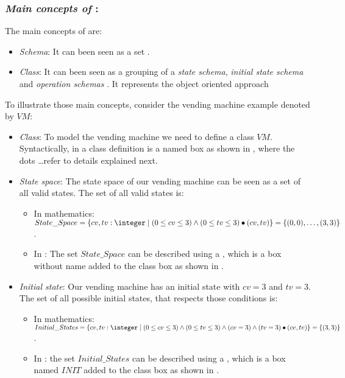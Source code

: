 \subsubsection{\textit{Main concepts of \oz{}}:} 
\label{main_concepts_oz} 
The main concepts of \oz{} are:
\begin{itemize}
\item \textit{Schema}: It can been seen as a set \cite{woodcock}.
\item \textit{Class}: It can been seen as a grouping of a \textit{state schema}, \textit{initial state schema} and \textit{operation schemas} \cite{kenji}. It represents the object oriented approach 
\end{itemize}
To illustrate those main concepts, consider the vending machine example denoted by $VM$:
\begin{itemize}
\item \textit{Class}: To model the vending machine we need to define a class $VM$. Syntactically, in \oz{}
a class definition is a named box as shown in , where the dots \dots refer to details explained next.


\item \textit{State space}: The state space of our vending machine can be seen as a set of all valid states. The set of all valid states is:
\begin{itemize}
\item In mathematics: $State\_Space=\{cv,tv: \integer\mid (0 \leq  cv \leq 3) \wedge
(0 \leq  tv \leq 3)\bullet(cv,tv)\}  =\{\pair{0}{0},\dots,\pair{3}{3}\}$.
\item In \oz{}: The set $State\_Space$ can be described using a , which is a box without name added to the class box as shown in .
\end{itemize}


\item \textit{Initial state}: Our vending machine has an initial state with $cv = 3$ and $tv = 3$. The set of all possible initial states, that respects those conditions is:  
\begin{itemize}
\item In mathematics: $Initial\_States =\{cv,tv: \integer\mid (0 \leq  cv \leq 3) \wedge
(0 \leq  tv \leq 3)\wedge (cv = 3) \wedge (tv = 3)\bullet(cv,tv)\}  =\{\pair{3}{3}\}$.
\item In \oz{}: the set $Initial\_States$ can be described using a , which is a box named $INIT$ added to the class box  as shown in .
\end{itemize}



\end{itemize}
